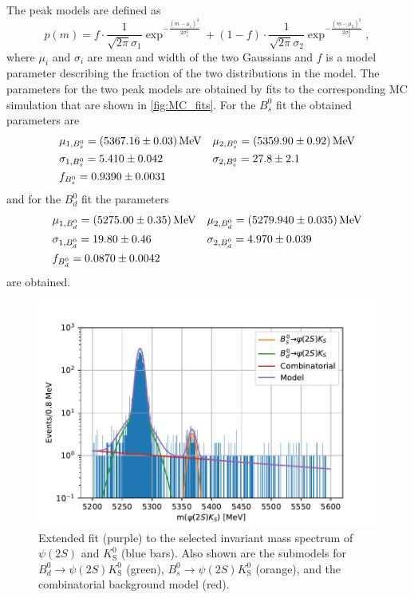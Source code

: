 The peak models are defined as
\begin{equation*}
  p(m) = f\cdot\frac{1}{\sqrt{2\pi}\sigma_1} \exp^{-\frac{(m - \mu_1)^2}{2 \sigma_1^2}} + (1 - f)\cdot \frac{1}{\sqrt{2\pi}\sigma_2} \exp^{-\frac{(m - \mu_2)^2}{2 \sigma_2^2}},
\end{equation*}
where $\mu_i$ and $\sigma_i$ are mean and width of the two Gaussians and $f$ is a model parameter describing the fraction of the two distributions in the model.
The parameters for the two peak models are obtained by fits to the corresponding MC simulation that are shown in \autoref{fig:MC_fits}. For the $B^0_s$ fit the obtained parameters are
\begin{align*}
  &\mu_{1, B^0_s} = \SI{5367.16 \pm 0.03}{\mega\eV} && \mu_{2, B^0_s} = \SI{5359.9 \pm 0.92}{\mega\eV}\\
  &\sigma_{1, B^0_s} = \num{5.41 \pm 0.042} && \sigma_{2, B^0_s} = \num{27.8 \pm 2.1}\\
  &f_{B^0_s} = \num{0.939 \pm 0.0031}
\end{align*}
and for the $B^0_d$ fit the parameters
\begin{align*}
  &\mu_{1, B^0_d} = \SI{5275.0 \pm 0.35}{\mega\eV} && \mu_{2, B^0_d} = \SI{5279.94 \pm 0.035}{\mega\eV}\\
  &\sigma_{1, B^0_d} = \num{19.8 \pm 0.46} && \sigma_{2, B^0_d} = \num{4.97 \pm 0.039}\\
  &f_{B^0_d} = \num{0.0870 \pm 0.0042}
\end{align*}
are obtained.

\begin{figure}[tb]
  \centering
  \includegraphics[width=12cm]{plots/data_fit_extended.pdf}
  \caption{Extended fit (purple) to the selected invariant mass spectrum of $\psi(2S)$ and $K^0_\mathrm{S}$ (blue bars). Also shown are the submodels for $B^0_d \to \psi(2S)K^0_\mathrm{S}$ (green), $B^0_s \to \psi(2S)K^0_\mathrm{S}$ (orange), and the combinatorial background model (red).}
  \label{fig:model}
\end{figure}

